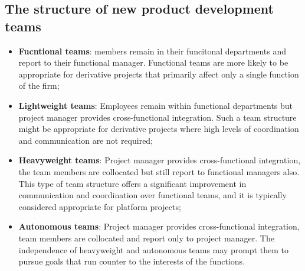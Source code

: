 \documentclass[12pt]{article}
\begin{document}
\subsection{The structure of new product development teams}
\begin{itemize}
    \item \textbf{Fucntional teams}: members remain in their funcitonal departments and report to their functional manager. Functional teams are more likely to be appropriate for derivative
    projects that primarily affect only a single function of the firm;
    \item \textbf{Lightweight teams}: Employees remain within functional departments but project manager provides cross-functional integration. Such a team structure might be appropriate
    for derivative projects where high levels of coordination and communication are
    not required;
    \item \textbf{Heavyweight teams}: Project manager provides cross-functional integration, the team members are collocated but still report to functional managers also. This type of team structure offers a significant improvement in
    communication and coordination over functional teams, and it is typically considered
    appropriate for platform projects;
    \item \textbf{Autonomous teams}: Project manager provides cross-functional integration, team members are collocated and report only to project manager.
    The independence of heavyweight and autonomous teams may prompt them to pursue goals that run counter to the interests of the functions. 
\end{itemize}
\end{document}
